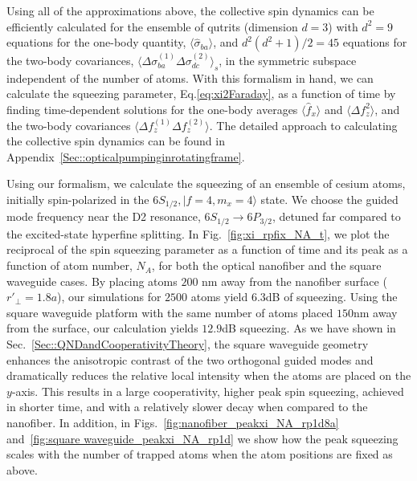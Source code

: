 \documentclass[aps,pra,twocolumn,superscriptaddress]{revtex4-1} %
\def\ket#1{\lvert{#1}\rangle}%
\newcommand{\expect}[1]{\big\langle #1 \big\rangle}
\begin{document}
Using all of the approximations above, the collective spin dynamics can be efficiently calculated for the ensemble of qutrits (dimension  $d=3$) with $ d^2=9 $ equations for the one-body quantity, $ \expect{\hat{\sigma}_{ba}} $, and $ d^2(d^2+1)/2=45 $ equations for the two-body covariances, $ \expect{\Delta \sigma_{ba}^{(1)}\Delta\sigma_{dc}^{(2)} }_s $, in the symmetric subspace independent of the number of atoms.  With this formalism in hand, we can calculate the squeezing parameter, Eq.\eqref{eq:xi2Faraday}, as a function of time by finding time-dependent solutions for the one-body averages $\expect{\hat{f}_x}$ and  $\expect{\Delta f_z^2}$, and the two-body covariances $\expect{\Delta f_z^{(1)} \Delta f_z^{(2)}}$.  The detailed approach to calculating the collective spin dynamics can be found in Appendix~\ref{Sec::opticalpumpinginrotatingframe}. 

Using our formalism, we calculate the squeezing of an ensemble of cesium atoms, initially spin-polarized in the $6S_{1/2},\ket{f=4, m_x=4}$ state.  We choose the guided mode frequency near the D2 resonance, $6S_{1/2}\rightarrow 6P_{3/2}$, detuned far compared to the excited-state hyperfine splitting. In Fig.~\ref{fig:xi_rpfix_NA_t}, we plot the reciprocal of the spin squeezing parameter as a function of time and its peak as a function of atom number, $ N_A $, for both the optical nanofiber and the square waveguide cases. By placing atoms $ 200$ nm away from the nanofiber surface ($ r'\!_\perp=1.8a $), our simulations for $ 2500 $ atoms yield $ 6.3 $dB of squeezing. Using the square waveguide platform with the same number of atoms placed $150 $nm away from the surface, our calculation yields $12.9$dB squeezing. As we have shown in Sec.~\ref{Sec::QNDandCooperativityTheory}, the square waveguide geometry enhances the anisotropic contrast of the two orthogonal guided modes and dramatically reduces the relative local intensity when the atoms are placed on the $ y $-axis. This results in a large cooperativity, higher peak spin squeezing, achieved in shorter time, and with a relatively slower decay when compared to the nanofiber. 
In addition, in Figs.~\ref{fig:nanofiber_peakxi_NA_rp1d8a} and~\ref{fig:square waveguide_peakxi_NA_rp1d} we show how the peak squeezing scales with the number of trapped atoms when the atom positions are fixed as above. 
\end{document}
